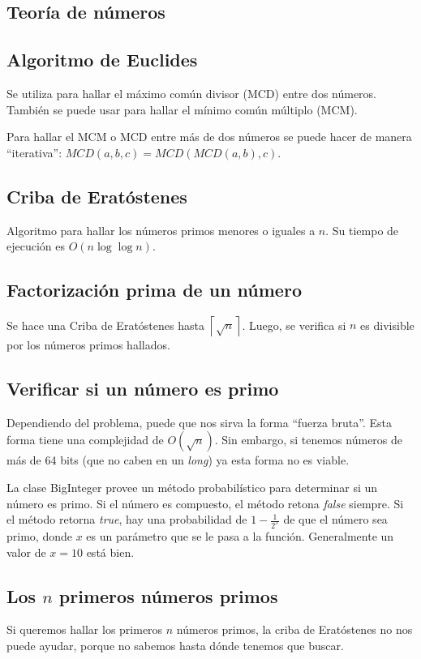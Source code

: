 \documentclass{article}
\begin{document}
\begin{multicols}{2}
\section{Teoría de números}

	\subsection{Algoritmo de Euclides}
	Se utiliza para hallar el máximo común divisor (MCD) entre dos números. También se puede usar para hallar el mínimo común múltiplo (MCM).

Para hallar el MCM o MCD entre más de dos números se puede hacer de manera ``iterativa'': \( MCD(a, b, c) = MCD(MCD(a, b), c) \).


	\subsection{Criba  de Eratóstenes}
	Algoritmo para hallar los números primos menores o iguales a \( n \). Su tiempo de ejecución es \( O(n \log \log n) \).
	
	\subsection{Factorización prima de un número}
	Se hace una Criba de Eratóstenes hasta \( \left \lceil{\sqrt{n}}\right \rceil  \). Luego, se verifica si \(n \) es divisible por los números primos hallados.
	
	\subsection{Verificar si un número es primo}
	Dependiendo del problema, puede que nos sirva la forma ``fuerza bruta''. Esta forma tiene una complejidad de \( O(\sqrt{n}) \). Sin embargo, si tenemos números de más de 64 bits (que no caben en un \emph{long}) ya esta forma no es viable. 
	
	La clase BigInteger provee un método probabilístico para determinar si un número es primo. Si el número es compuesto, el método retona \emph{false} siempre. Si el método retorna \emph{true}, hay una probabilidad de \( 1-\frac{1}{2^x} \) de que el número sea primo, donde \(x\) es un parámetro que se le pasa a la función. Generalmente un valor de \(x = 10\) está bien.
	
	\subsection{Los \(n\) primeros números primos}
	Si queremos hallar los primeros \( n \) números primos, la criba de Eratóstenes	no nos puede ayudar, porque no sabemos hasta dónde tenemos que buscar.
	

\end{multicols}
\end{document}
